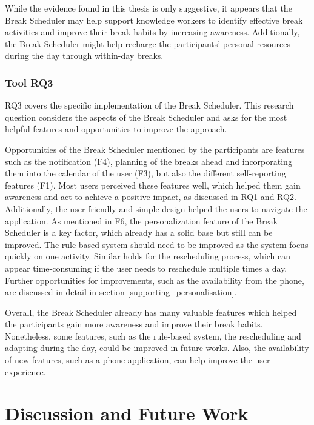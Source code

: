 \documentclass{hasel_thesis}
\begin{document}
While the evidence found in this thesis is only suggestive, it appears that the Break Scheduler may help support knowledge workers to identify effective break activities and improve their break habits by increasing awareness. Additionally, the Break Scheduler might help recharge the participants' personal resources during the day through within-day breaks.

\subsection{Tool RQ3} \label{RQ3} %
RQ3 covers the specific implementation of the Break Scheduler. This research question considers the aspects of the Break Scheduler and asks for the most helpful features and opportunities to improve the approach. 

Opportunities of the Break Scheduler mentioned by the participants are features such as the notification (F4), planning of the breaks ahead and incorporating them into the calendar of the user (F3), but also the different self-reporting features (F1). Most users perceived these features well, which helped them gain awareness and act to achieve a positive impact, as discussed in RQ1 and RQ2. Additionally, the user-friendly and simple design helped the users to navigate the application. As mentioned in F6, the personalization feature of the Break Scheduler is a key factor, which already has a solid base but still can be improved. The rule-based system should need to be improved as the system focus quickly on one activity. Similar holds for the rescheduling process, which can appear time-consuming if the user needs to reschedule multiple times a day. Further opportunities for improvements, such as the availability from the phone, are discussed in detail in section \ref{supporting_personalisation}. 

Overall, the Break Scheduler already has many valuable features which helped the participants gain more awareness and improve their break habits. Nonetheless, some features, such as the rule-based system, the rescheduling and adapting during the day, could be improved in future works. Also, the availability of new features, such as a phone application, can help improve the user experience. 

\chapter{Discussion and Future Work} \label{discussion}
\end{document}
